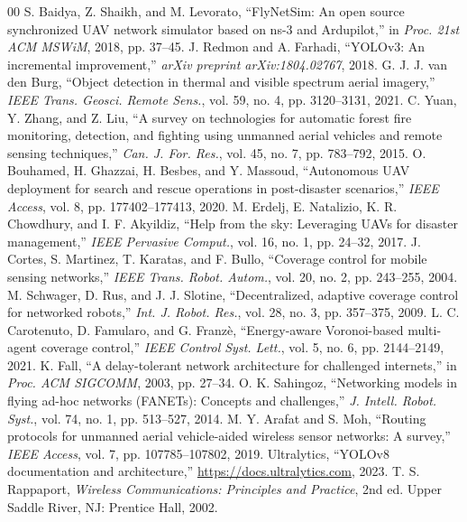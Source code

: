 \documentclass[conference]{IEEEtran}
\begin{document}
\balance
\begin{thebibliography}{00}
 S. Baidya, Z. Shaikh, and M. Levorato, ``FlyNetSim: An open source synchronized UAV network simulator based on ns-3 and Ardupilot,'' in \textit{Proc. 21st ACM MSWiM}, 2018, pp. 37--45.
 J. Redmon and A. Farhadi, ``YOLOv3: An incremental improvement,'' \textit{arXiv preprint arXiv:1804.02767}, 2018.
 G. J. J. van den Burg, ``Object detection in thermal and visible spectrum aerial imagery,'' \textit{IEEE Trans. Geosci. Remote Sens.}, vol. 59, no. 4, pp. 3120--3131, 2021.
 C. Yuan, Y. Zhang, and Z. Liu, ``A survey on technologies for automatic forest fire monitoring, detection, and fighting using unmanned aerial vehicles and remote sensing techniques,'' \textit{Can. J. For. Res.}, vol. 45, no. 7, pp. 783--792, 2015.
 O. Bouhamed, H. Ghazzai, H. Besbes, and Y. Massoud, ``Autonomous UAV deployment for search and rescue operations in post-disaster scenarios,'' \textit{IEEE Access}, vol. 8, pp. 177402--177413, 2020.
 M. Erdelj, E. Natalizio, K. R. Chowdhury, and I. F. Akyildiz, ``Help from the sky: Leveraging UAVs for disaster management,'' \textit{IEEE Pervasive Comput.}, vol. 16, no. 1, pp. 24--32, 2017.
 J. Cortes, S. Martinez, T. Karatas, and F. Bullo, ``Coverage control for mobile sensing networks,'' \textit{IEEE Trans. Robot. Autom.}, vol. 20, no. 2, pp. 243--255, 2004.
 M. Schwager, D. Rus, and J. J. Slotine, ``Decentralized, adaptive coverage control for networked robots,'' \textit{Int. J. Robot. Res.}, vol. 28, no. 3, pp. 357--375, 2009.
 L. C. Carotenuto, D. Famularo, and G. Franz{\`e}, ``Energy-aware Voronoi-based multi-agent coverage control,'' \textit{IEEE Control Syst. Lett.}, vol. 5, no. 6, pp. 2144--2149, 2021.
 K. Fall, ``A delay-tolerant network architecture for challenged internets,'' in \textit{Proc. ACM SIGCOMM}, 2003, pp. 27--34.
 O. K. Sahingoz, ``Networking models in flying ad-hoc networks (FANETs): Concepts and challenges,'' \textit{J. Intell. Robot. Syst.}, vol. 74, no. 1, pp. 513--527, 2014.
 M. Y. Arafat and S. Moh, ``Routing protocols for unmanned aerial vehicle-aided wireless sensor networks: A survey,'' \textit{IEEE Access}, vol. 7, pp. 107785--107802, 2019.
 Ultralytics, ``YOLOv8 documentation and architecture,'' \url{https://docs.ultralytics.com}, 2023.
 T. S. Rappaport, \textit{Wireless Communications: Principles and Practice}, 2nd ed. Upper Saddle River, NJ: Prentice Hall, 2002.

\end{thebibliography}
\end{document}
